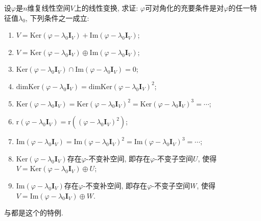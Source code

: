 \documentclass[../../main.tex]{subfiles}
\begin{document}
\begin{proposition}\label{proposition:可对角化的补充}
设\(\varphi\)是\(n\)维复线性空间\(V\)上的线性变换, 求证: \(\varphi\)可对角化的充要条件是对\(\varphi\)的任一特征值\(\lambda_{0}\), 下列条件之一成立:
\begin{enumerate}[(1)]
\item \(V = \mathrm{Ker}(\varphi-\lambda_{0}\boldsymbol{I}_{V})+\mathrm{Im}(\varphi-\lambda_{0}\boldsymbol{I}_{V})\);

\item \(V = \mathrm{Ker}(\varphi-\lambda_{0}\boldsymbol{I}_{V})\oplus\mathrm{Im}(\varphi-\lambda_{0}\boldsymbol{I}_{V})\);

\item \(\mathrm{Ker}(\varphi-\lambda_{0}\boldsymbol{I}_{V})\cap\mathrm{Im}(\varphi-\lambda_{0}\boldsymbol{I}_{V}) = 0\);

\item \(\mathrm{dim}\mathrm{Ker}(\varphi-\lambda_{0}\boldsymbol{I}_{V})=\mathrm{dim}\mathrm{Ker}(\varphi-\lambda_{0}\boldsymbol{I}_{V})^{2}\);

\item \(\mathrm{Ker}(\varphi-\lambda_{0}\boldsymbol{I}_{V})=\mathrm{Ker}(\varphi-\lambda_{0}\boldsymbol{I}_{V})^{2}=\mathrm{Ker}(\varphi-\lambda_{0}\boldsymbol{I}_{V})^{3}=\cdots\);

\item \(\mathrm{r}(\varphi-\lambda_{0}\boldsymbol{I}_{V})=\mathrm{r}((\varphi-\lambda_{0}\boldsymbol{I}_{V})^{2})\);

\item \(\mathrm{Im}(\varphi-\lambda_{0}\boldsymbol{I}_{V})=\mathrm{Im}(\varphi-\lambda_{0}\boldsymbol{I}_{V})^{2}=\mathrm{Im}(\varphi-\lambda_{0}\boldsymbol{I}_{V})^{3}=\cdots\);

\item \(\mathrm{Ker}(\varphi-\lambda_{0}\boldsymbol{I}_{V})\)存在\(\varphi\)-不变补空间, 即存在\(\varphi\)-不变子空间\(U\), 使得\(V = \mathrm{Ker}(\varphi-\lambda_{0}\boldsymbol{I}_{V})\oplus U\);

\item \(\mathrm{Im}(\varphi-\lambda_{0}\boldsymbol{I}_{V})\)存在\(\varphi\)-不变补空间, 即存在\(\varphi\)-不变子空间\(W\), 使得\(V = \mathrm{Im}(\varphi-\lambda_{0}\boldsymbol{I}_{V})\oplus W\).
\end{enumerate}
\end{proposition}
\begin{remark}
与都是这个的特例.
\end{remark}
\end{document}
